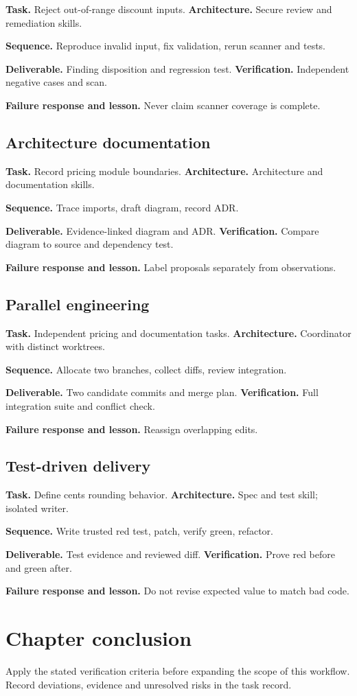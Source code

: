\textbf{Task.} Reject out-of-range discount inputs. \textbf{Architecture.} Secure review and remediation skills.

\textbf{Sequence.} Reproduce invalid input, fix validation, rerun scanner and tests.

\textbf{Deliverable.} Finding disposition and regression test. \textbf{Verification.} Independent negative cases and scan.

\textbf{Failure response and lesson.} Never claim scanner coverage is complete.

\subsection{Architecture documentation}

\textbf{Task.} Record pricing module boundaries. \textbf{Architecture.} Architecture and documentation skills.

\textbf{Sequence.} Trace imports, draft diagram, record ADR.

\textbf{Deliverable.} Evidence-linked diagram and ADR. \textbf{Verification.} Compare diagram to source and dependency test.

\textbf{Failure response and lesson.} Label proposals separately from observations.

\subsection{Parallel engineering}

\textbf{Task.} Independent pricing and documentation tasks. \textbf{Architecture.} Coordinator with distinct worktrees.

\textbf{Sequence.} Allocate two branches, collect diffs, review integration.

\textbf{Deliverable.} Two candidate commits and merge plan. \textbf{Verification.} Full integration suite and conflict check.

\textbf{Failure response and lesson.} Reassign overlapping edits.

\subsection{Test-driven delivery}

\textbf{Task.} Define cents rounding behavior. \textbf{Architecture.} Spec and test skill; isolated writer.

\textbf{Sequence.} Write trusted red test, patch, verify green, refactor.

\textbf{Deliverable.} Test evidence and reviewed diff. \textbf{Verification.} Prove red before and green after.

\textbf{Failure response and lesson.} Do not revise expected value to match bad code.

\section{Chapter conclusion}

Apply the stated verification criteria before expanding the scope of this workflow. Record deviations, evidence and unresolved risks in the task record.

